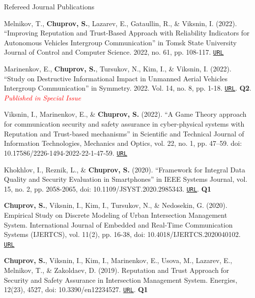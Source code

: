 \begin{rSection}{Refereed Journal Publications}
\begin{enumerate}[label=[J{{\arabic*}]}]
\item Melnikov, T., \textbf{Chuprov, S.}, Lazarev, E., Gataullin, R., \& Viksnin, I. (2022). ``Improving Reputation and Trust-Based Approach with Reliability Indicators for Autonomous Vehicles Intergroup Communication'' in Tomsk State University Journal of Control and Computer Science. 2022, no. 61, pp. 108-117.
\href{https://journals.tsu.ru/informatics/en/&journal_page=archive&id=2302&article_id=51752}{\nolinkurl{URL}}

\item Marinenkov, E., \textbf{Chuprov, S.}, Tursukov, N., Kim, I., \& Viksnin, I. (2022). ``Study on Destructive Informational Impact in Unmanned Aerial Vehicles Intergroup Communication'' in Symmetry. 2022. Vol. 14, no. 8, pp. 1-18. \href{https://www.mdpi.com/2073-8994/14/8/1580/htm}{\nolinkurl{URL}}. \textbf{Q2}. \scriptsize{\textcolor{red}{\textit{Published in Special Issue}}}\normalsize

\item Viksnin, I., Marinenkov, E., \& \textbf{Chuprov, S.} (2022). ``A Game Theory approach for communication security and safety assurance in cyber-physical systems with Reputation and Trust-based mechanisms'' in Scientific and Technical Journal of Information Technologies, Mechanics and Optics, vol. 22, no. 1, pp. 47–59. doi: 10.17586/2226-1494-2022-22-1-47-59. \href{https://ntv.ifmo.ru/en/article/20971/primenenie_teorii_igr_dlya_obespecheniya_bezopasnosti_kommunikacii_kiberfizicheskoy_sistemy_s_ispolzovaniem_mehanizmov_reputacii_i_doveriya.htm}{\nolinkurl{URL}}

\item Khokhlov, I., Reznik, L., \& \textbf{Chuprov, S.} (2020). ``Framework for Integral Data Quality and Security Evaluation in Smartphones'' in IEEE Systems Journal, vol. 15, no. 2, pp. 2058-2065, doi: 10.1109/JSYST.2020.2985343. \href{https://ieeexplore.ieee.org/abstract/document/9080556}{\nolinkurl{URL}}. \textbf{Q1}

\item \textbf{Chuprov, S.}, Viksnin, I., Kim, I., Tursukov, N., \& Nedosekin, G. (2020). Empirical Study on Discrete Modeling of Urban Intersection Management System. International Journal of Embedded and Real-Time Communication Systems (IJERTCS), vol. 11(2), pp. 16-38, doi: 10.4018/IJERTCS.2020040102. \href{https://www.igi-global.com/article/empirical-study-on-discrete-modeling-of-urban-intersection-management-system/258082}{\nolinkurl{URL}}

\item \textbf{Chuprov, S.}, Viksnin, I., Kim, I., Marinenkov, E., Usova, M., Lazarev, E., Melnikov, T., \& Zakoldaev, D. (2019). Reputation and Trust Approach for Security and Safety Assurance in Intersection Management System. Energies, 12(23), 4527, doi: 10.3390/en12234527. \href{https://www.mdpi.com/1996-1073/12/23/4527}{\nolinkurl{URL}}. \textbf{Q1}
\end{enumerate}

\end{rSection}

